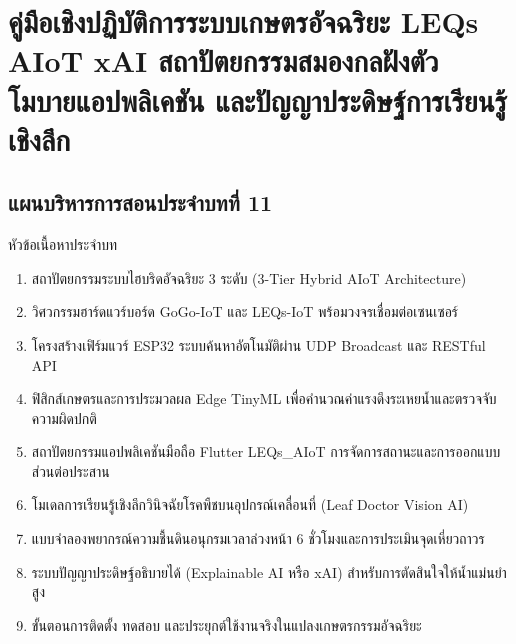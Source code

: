 \chapter{คู่มือเชิงปฏิบัติการระบบเกษตรอัจฉริยะ LEQs AIoT xAI สถาปัตยกรรมสมองกลฝังตัว โมบายแอปพลิเคชัน และปัญญาประดิษฐ์การเรียนรู้เชิงลึก}
\label{chap:ch11}

\section*{แผนบริหารการสอนประจำบทที่ 11}

\begin{planbox}{หัวข้อเนื้อหาประจำบท}
\begin{enumerate}[topsep=2pt, itemsep=1pt, partopsep=0pt, parsep=0pt, leftmargin=1.5em]
    \item สถาปัตยกรรมระบบไฮบริดอัจฉริยะ 3 ระดับ (3-Tier Hybrid AIoT Architecture)
    \item วิศวกรรมฮาร์ดแวร์บอร์ด GoGo-IoT และ LEQs-IoT พร้อมวงจรเชื่อมต่อเซนเซอร์
    \item โครงสร้างเฟิร์มแวร์ ESP32 ระบบค้นหาอัตโนมัติผ่าน UDP Broadcast และ RESTful API
    \item ฟิสิกส์เกษตรและการประมวลผล Edge TinyML เพื่อคำนวณค่าแรงดึงระเหยน้ำและตรวจจับความผิดปกติ
    \item สถาปัตยกรรมแอปพลิเคชันมือถือ Flutter LEQs\_AIoT การจัดการสถานะและการออกแบบส่วนต่อประสาน
    \item โมเดลการเรียนรู้เชิงลึกวินิจฉัยโรคพืชบนอุปกรณ์เคลื่อนที่ (Leaf Doctor Vision AI)
    \item แบบจำลองพยากรณ์ความชื้นดินอนุกรมเวลาล่วงหน้า 6 ชั่วโมงและการประเมินจุดเหี่ยวถาวร
    \item ระบบปัญญาประดิษฐ์อธิบายได้ (Explainable AI หรือ xAI) สำหรับการตัดสินใจให้น้ำแม่นยำสูง
    \item ขั้นตอนการติดตั้ง ทดสอบ และประยุกต์ใช้งานจริงในแปลงเกษตรกรรมอัจฉริยะ
\end{enumerate}
\end{planbox}

